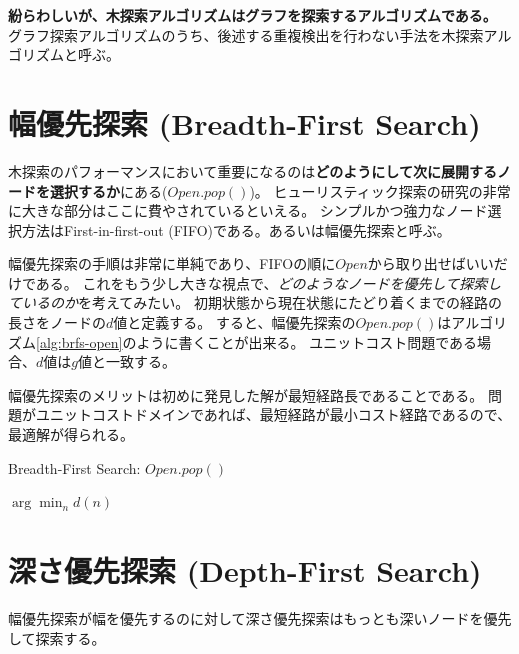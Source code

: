 \documentclass[b5paper]{report}
\begin{document}
{\bf 紛らわしいが、木探索アルゴリズムはグラフを探索するアルゴリズムである。}
グラフ探索アルゴリズムのうち、後述する重複検出を行わない手法を木探索アルゴリズムと呼ぶ。









\section{幅優先探索 (Breadth-First Search)}
\label{sec:breadth-first-search}

木探索のパフォーマンスにおいて重要になるのは{\bf どのようにして次に展開するノードを選択するか}にある($Open.pop()$)。
ヒューリスティック探索の研究の非常に大きな部分はここに費やされているといえる。
シンプルかつ強力なノード選択方法はFirst-in-first-out (FIFO)である。あるいは幅優先探索と呼ぶ。

幅優先探索の手順は非常に単純であり、FIFOの順に$Open$から取り出せばいいだけである。
これをもう少し大きな視点で、{\it どのようなノードを優先して探索しているのか}を考えてみたい。
初期状態から現在状態にたどり着くまでの経路の長さをノードの$d$値と定義する。
すると、幅優先探索の$Open.pop()$はアルゴリズム\ref{alg:brfs-open}のように書くことが出来る。
ユニットコスト問題である場合、$d$値は$g$値と一致する。

幅優先探索のメリットは初めに発見した解が最短経路長であることである。
問題がユニットコストドメインであれば、最短経路が最小コスト経路であるので、最適解が得られる。

\begin{algorithm}
\caption{Breadth-First Search: $Open.pop()$}
\label{alg:brfs-open}
	\Return $\arg \min_n d(n)$
\end{algorithm}

\section{深さ優先探索 (Depth-First Search)}
\label{sec:depth-first-search}

幅優先探索が幅を優先するのに対して深さ優先探索はもっとも深いノードを優先して探索する。
\end{document}
